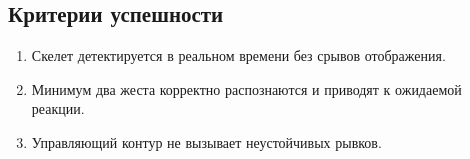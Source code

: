 \subsection{Критерии успешности}
\begin{enumerate}
\item Скелет детектируется в реальном времени без срывов отображения.
\item Минимум два жеста корректно распознаются и приводят к ожидаемой реакции.
\item Управляющий контур не вызывает неустойчивых рывков.
\end{enumerate}
